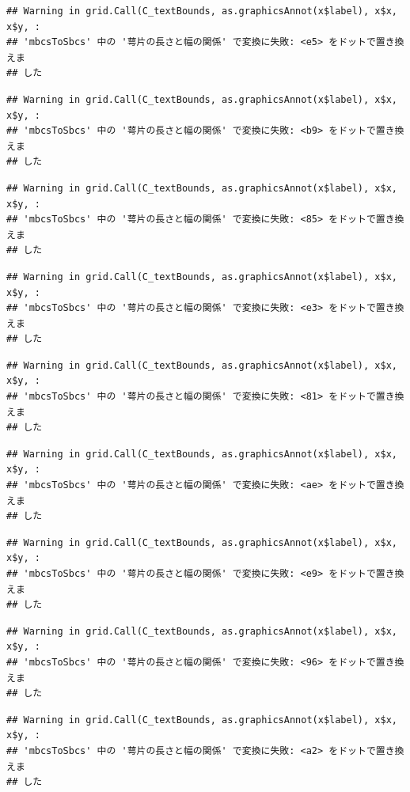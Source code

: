 \documentclass[
]{book}
\begin{document}
\begin{verbatim}
## Warning in grid.Call(C_textBounds, as.graphicsAnnot(x$label), x$x, x$y, :
## 'mbcsToSbcs' 中の '萼片の長さと幅の関係' で変換に失敗: <e5> をドットで置き換えま
## した
\end{verbatim}

\begin{verbatim}
## Warning in grid.Call(C_textBounds, as.graphicsAnnot(x$label), x$x, x$y, :
## 'mbcsToSbcs' 中の '萼片の長さと幅の関係' で変換に失敗: <b9> をドットで置き換えま
## した
\end{verbatim}

\begin{verbatim}
## Warning in grid.Call(C_textBounds, as.graphicsAnnot(x$label), x$x, x$y, :
## 'mbcsToSbcs' 中の '萼片の長さと幅の関係' で変換に失敗: <85> をドットで置き換えま
## した
\end{verbatim}

\begin{verbatim}
## Warning in grid.Call(C_textBounds, as.graphicsAnnot(x$label), x$x, x$y, :
## 'mbcsToSbcs' 中の '萼片の長さと幅の関係' で変換に失敗: <e3> をドットで置き換えま
## した
\end{verbatim}

\begin{verbatim}
## Warning in grid.Call(C_textBounds, as.graphicsAnnot(x$label), x$x, x$y, :
## 'mbcsToSbcs' 中の '萼片の長さと幅の関係' で変換に失敗: <81> をドットで置き換えま
## した
\end{verbatim}

\begin{verbatim}
## Warning in grid.Call(C_textBounds, as.graphicsAnnot(x$label), x$x, x$y, :
## 'mbcsToSbcs' 中の '萼片の長さと幅の関係' で変換に失敗: <ae> をドットで置き換えま
## した
\end{verbatim}

\begin{verbatim}
## Warning in grid.Call(C_textBounds, as.graphicsAnnot(x$label), x$x, x$y, :
## 'mbcsToSbcs' 中の '萼片の長さと幅の関係' で変換に失敗: <e9> をドットで置き換えま
## した
\end{verbatim}

\begin{verbatim}
## Warning in grid.Call(C_textBounds, as.graphicsAnnot(x$label), x$x, x$y, :
## 'mbcsToSbcs' 中の '萼片の長さと幅の関係' で変換に失敗: <96> をドットで置き換えま
## した
\end{verbatim}

\begin{verbatim}
## Warning in grid.Call(C_textBounds, as.graphicsAnnot(x$label), x$x, x$y, :
## 'mbcsToSbcs' 中の '萼片の長さと幅の関係' で変換に失敗: <a2> をドットで置き換えま
## した
\end{verbatim}
\end{document}
